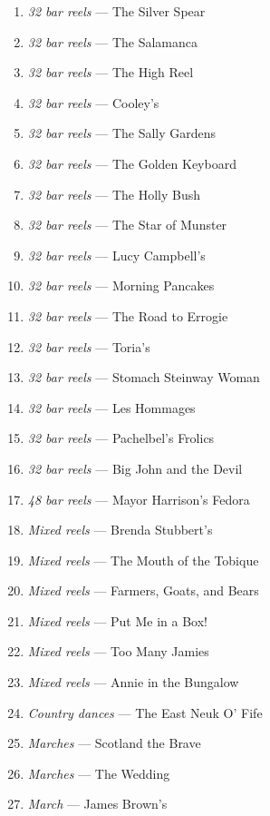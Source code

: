 \documentclass[11pt]{article}
\begin{document}
\begin{multicols*}{2}
\begin{enumerate}
        \item[] \textit{32 bar reels} --- The Silver Spear
        \item[] \textit{32 bar reels} --- The Salamanca
        \item[] \textit{32 bar reels} --- The High Reel
        \item[] \textit{32 bar reels} --- Cooley's
        \item[] \textit{32 bar reels} --- The Sally Gardens
        \item[] \textit{32 bar reels} --- The Golden Keyboard
        \item[] \textit{32 bar reels} --- The Holly Bush
        \item[] \textit{32 bar reels} --- The Star of Munster
        \item[] \textit{32 bar reels} --- Lucy Campbell's
        \item[] \textit{32 bar reels} --- Morning Pancakes
        \item[] \textit{32 bar reels} --- The Road to Errogie
        \item[] \textit{32 bar reels} --- Toria's
        \item[] \textit{32 bar reels} --- Stomach Steinway Woman
        \item[] \textit{32 bar reels} --- Les Hommages
        \item[] \textit{32 bar reels} --- Pachelbel's Frolics
        \item[] \textit{32 bar reels} --- Big John and the Devil
        \item[] \textit{48 bar reels} --- Mayor Harrison's Fedora
        \item[] \textit{Mixed reels} --- Brenda Stubbert's
        \item[] \textit{Mixed reels} --- The Mouth of the Tobique
        \item[] \textit{Mixed reels} --- Farmers, Goats, and Bears
        \item[] \textit{Mixed reels} --- Put Me in a Box!
        \item[] \textit{Mixed reels} --- Too Many Jamies
        \item[] \textit{Mixed reels} --- Annie in the Bungalow
        \item[] \textit{Country dances} --- The East Neuk O' Fife
        \item[] \textit{Marches} --- Scotland the Brave
        \item[] \textit{Marches} --- The Wedding
        \item[] \textit{March} --- James Brown's

\end{enumerate}
\end{multicols*}
\end{document}
